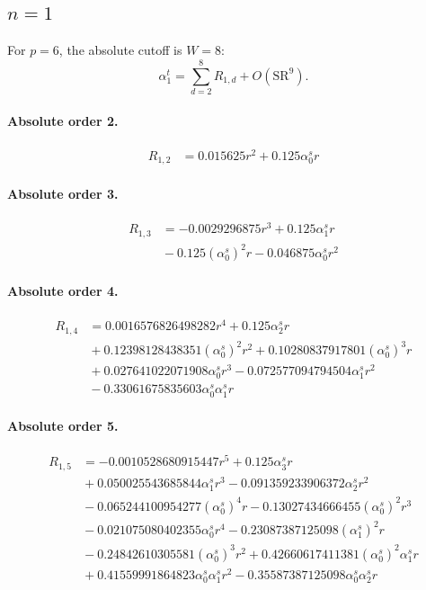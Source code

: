 \documentclass[10pt]{article}
\begin{document}
\subsection{$n=1$}
For $p=6$, the absolute cutoff is $W=8$:
\[\alpha_{1}^t=\sum_{d=2}^{8}R_{1,d}+O(\mathrm{SR}^{9}).\]
\paragraph{Absolute order 2.}
\begin{align*}
R_{1,2} &= 0.015625 r^{2} + 0.125 \alpha_{0}^s r
\end{align*}

\paragraph{Absolute order 3.}
\begin{align*}
R_{1,3} &=  - 0.0029296875 r^{3} + 0.125 \alpha_{1}^s r \\
&{}  - 0.125 \left(\alpha_{0}^s\right)^{2} r - 0.046875 \alpha_{0}^s r^{2}
\end{align*}

\paragraph{Absolute order 4.}
\begin{align*}
R_{1,4} &= 0.0016576826498282 r^{4} + 0.125 \alpha_{2}^s r \\
&{}  + 0.12398128438351 \left(\alpha_{0}^s\right)^{2} r^{2} + 0.10280837917801 \left(\alpha_{0}^s\right)^{3} r \\
&{}  + 0.027641022071908 \alpha_{0}^s r^{3} - 0.072577094794504 \alpha_{1}^s r^{2} \\
&{}  - 0.33061675835603 \alpha_{0}^s \alpha_{1}^s r
\end{align*}

\paragraph{Absolute order 5.}
\begin{align*}
R_{1,5} &=  - 0.0010528680915447 r^{5} + 0.125 \alpha_{3}^s r \\
&{}  + 0.050025543685844 \alpha_{1}^s r^{3} - 0.091359233906372 \alpha_{2}^s r^{2} \\
&{}  - 0.065244100954277 \left(\alpha_{0}^s\right)^{4} r - 0.13027434666455 \left(\alpha_{0}^s\right)^{2} r^{3} \\
&{}  - 0.021075080402355 \alpha_{0}^s r^{4} - 0.23087387125098 \left(\alpha_{1}^s\right)^{2} r \\
&{}  - 0.24842610305581 \left(\alpha_{0}^s\right)^{3} r^{2} + 0.42660617411381 \left(\alpha_{0}^s\right)^{2} \alpha_{1}^s r \\
&{}  + 0.41559991864823 \alpha_{0}^s \alpha_{1}^s r^{2} - 0.35587387125098 \alpha_{0}^s \alpha_{2}^s r
\end{align*}
\end{document}
